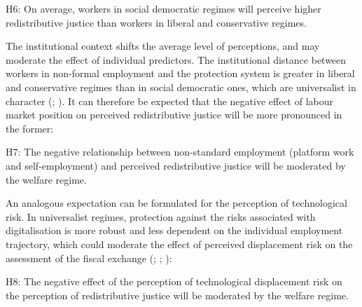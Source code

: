 \documentclass[
  12pt,
]{article}
\begin{document}
\begin{tcolorbox}[enhanced jigsaw, arc=.35mm, bottomrule=.15mm, breakable, colback=white, colframe=quarto-callout-color-frame, left=2mm, leftrule=.75mm, opacityback=0, rightrule=.15mm, toprule=.15mm]

H6: On average, workers in social democratic regimes will perceive
higher redistributive justice than workers in liberal and conservative
regimes.

\end{tcolorbox}

The institutional context shifts the average level of perceptions, and
may moderate the effect of individual predictors. The institutional
distance between workers in non-formal employment and the protection
system is greater in liberal and conservative regimes than in social
democratic ones, which are universalist in character
(;
). It
can therefore be expected that the negative effect of labour market
position on perceived redistributive justice will be more pronounced in
the former:

\begin{tcolorbox}[enhanced jigsaw, arc=.35mm, bottomrule=.15mm, breakable, colback=white, colframe=quarto-callout-color-frame, left=2mm, leftrule=.75mm, opacityback=0, rightrule=.15mm, toprule=.15mm]

H7: The negative relationship between non-standard employment (platform
work and self-employment) and perceived redistributive justice will be
moderated by the welfare regime.

\end{tcolorbox}

An analogous expectation can be formulated for the perception of
technological risk. In universalist regimes, protection against the
risks associated with digitalisation is more robust and less dependent
on the individual employment trajectory, which could moderate the effect
of perceived displacement risk on the assessment of the fiscal exchange
(;
;
):

\begin{tcolorbox}[enhanced jigsaw, arc=.35mm, bottomrule=.15mm, breakable, colback=white, colframe=quarto-callout-color-frame, left=2mm, leftrule=.75mm, opacityback=0, rightrule=.15mm, toprule=.15mm]

H8: The negative effect of the perception of technological displacement
risk on the perception of redistributive justice will be moderated by
the welfare regime.

\end{tcolorbox}
\end{document}
